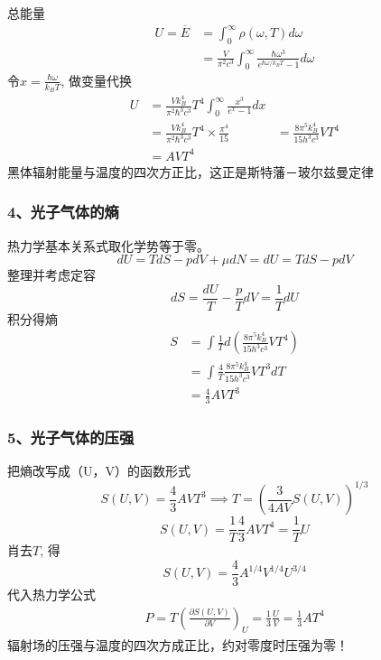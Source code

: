 \begin{frame}
  \frametitle{}
总能量
\[ \begin{aligned}
  U = \overline{E} &= \int_0^\infty \rho(\omega, T) d \omega \\ 
  &= \frac{ V}{\pi ^2c^3} \int_0^\infty \frac{\hbar\omega^3}{e^{\hbar \omega /k_B T}-1} d \omega
\end{aligned} \]
令$x= \frac{\hbar\omega}{k_B T}$, 做变量代换
\[ \begin{aligned}
  U &= \frac{Vk_B^4}{\pi ^2\hbar^3c^3} T^4 \int_0^\infty \frac{x^3}{e^{x}-1} d x  \\
  &= \frac{Vk_B^4}{\pi ^2\hbar^3c^3} T^4 \times \frac{\pi ^4}{15}
  &= \frac{8\pi ^5 k_B^4}{15 h^3 c^3}V T^4 \\
  &= AVT^4
\end{aligned} \]
黑体辐射能量与温度的四次方正比，这正是斯特藩－玻尔兹曼定律 
\end{frame} 

\begin{frame}
  \frametitle{ 4、光子气体的熵}
  热力学基本关系式取化学势等于零。
  \[ dU = TdS - pdV + \mu dN = dU = TdS - pdV\]
  整理并考虑定容
  \[ dS = \frac{dU}{T} - \frac{p}{T}dV = \frac{1}{T}dU\]
  积分得熵
  \[ \begin{aligned} 
    S &= \int \frac{1}{T} d(\frac{8\pi ^5 k_B^4}{15 h^3 c^3}V T^4) \\
    &= \int \frac{4}{T} \frac{8\pi ^5 k_B^4}{15 h^3 c^3}V T^3 dT \\
    &= \frac{4}{3} AV T^3
  \end{aligned} \]
\end{frame} 

\begin{frame}
  \frametitle{ 5、光子气体的压强}
  把熵改写成（U，V）的函数形式
  \[ S(U,V) = \frac{4}{3} AV T^3 \implies T = \left(\frac{3}{4AV}  S(U,V)\right)^{1/3} \]
  \[ S(U,V) = \frac{1}{T} \frac{4}{3} AV T^4  =  \frac{1}{T} U \]
  肖去$T$, 得
  \[ S(U,V) = \frac{4}{3} A^{1/4}V^{1/4} U ^{3/4}\]
  代入热力学公式
  \[ \begin{aligned}
    P = T \left( \frac{\partial S(U,V)}{\partial V} \right)_U =  \frac{1}{3} \frac{U}{V} = \frac{1}{3} AT^4
  \end{aligned} \]
  辐射场的压强与温度的四次方成正比，约对零度时压强为零！
\end{frame} 


